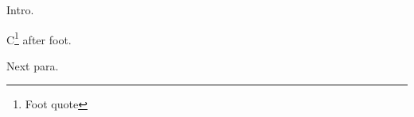 \documentclass{article}
\begin{document}
Intro.

C\footnote{\quote Foot quote} after foot.

Next para.
\end{document}
